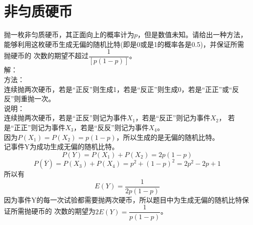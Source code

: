 \documentclass[a4papers]{ctexart}
\begin{document}
\section{非匀质硬币}
抛一枚非匀质硬币，其正面向上的概率计为$p$，但是数值未知。请给出一种方法，
能够利用这枚硬币生成无偏的随机比特(即是0或是1的概率各是0.5)，并保证所需抛硬币的
次数的期望不超过$\dfrac{1}{[p(1-p)]}$。\\
解：\\
方法：\\
\indent 连续抛两次硬币，若是“正反”则生成1，若是“反正”则生成0，若是“正正”或“反反”则重抛一次。\\
说明：\\
\indent 连续抛两次硬币，若是“正反”则记为事件$X_1$，若是“反正”则记为事件$X_2$，
若是“正正”则记为事件$X_3$，若是“反反”则记为事件$X_4$。\\
\indent 因为$P(X_1)=P(X_2)=p(1-p)$，所以生成的是无偏的随机比特。\\
\indent 记事件Y为成功生成无偏的随机比特。
\[P(Y)=P(X_1)+P(X_2)=2p(1-p)\]
\[
P(\overline Y)=P(X_3)+P(X_4)=p^2+(1-p)^2=2p^2-2p+1
\]
\indent 所以有
\[E(Y)=\dfrac{1}{2p(1-p)}\]
\indent 因为事件Y的每一次试验都需要抛两次硬币，所以题目中为生成无偏的随机比特保证所需抛硬币的
次数的期望为$2E(Y)=\dfrac{1}{p(1-p)}$。
\end{document}
